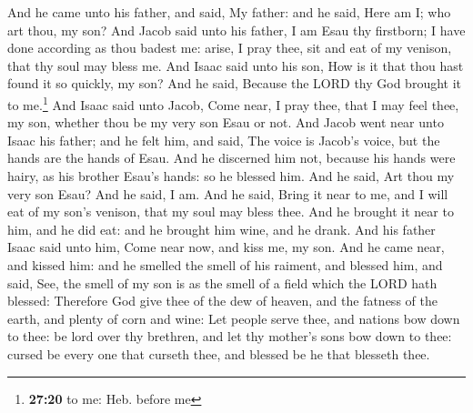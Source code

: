  And he came unto his father, and said, My father: and he
said, Here am I; who art thou, my son?  And Jacob said
unto his father, I am Esau thy firstborn; I have done according as thou
badest me: arise, I pray thee, sit and eat of my venison, that thy soul
may bless me.  And Isaac said unto his son, How is it
that thou hast found it so quickly, my son? And he said, Because the
LORD thy God brought it to me.\footnote{\textbf{27:20} to me: Heb.
  before me}  And Isaac said unto Jacob, Come near, I
pray thee, that I may feel thee, my son, whether thou be my very son
Esau or not.  And Jacob went near unto Isaac his father;
and he felt him, and said, The voice is Jacob's voice, but the hands are
the hands of Esau.  And he discerned him not, because his
hands were hairy, as his brother Esau's hands: so he blessed him.
 And he said, Art thou my very son Esau? And he said, I
am.  And he said, Bring it near to me, and I will eat of
my son's venison, that my soul may bless thee. And he brought it near to
him, and he did eat: and he brought him wine, and he drank.
 And his father Isaac said unto him, Come near now, and
kiss me, my son.  And he came near, and kissed him: and
he smelled the smell of his raiment, and blessed him, and said, See, the
smell of my son is as the smell of a field which the LORD hath blessed:
 Therefore God give thee of the dew of heaven, and the
fatness of the earth, and plenty of corn and wine:  Let
people serve thee, and nations bow down to thee: be lord over thy
brethren, and let thy mother's sons bow down to thee: cursed be every
one that curseth thee, and blessed be he that blesseth thee.

